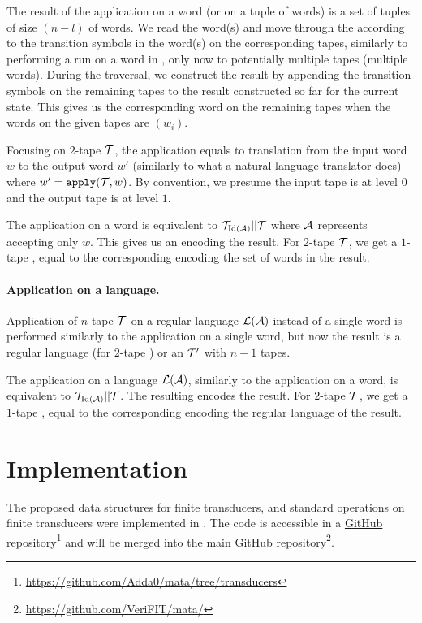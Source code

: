 The result of the application on a word (or on a tuple of words) is a set of tuples of size $(n - l)$ of words.
We read the word(s) and move through the \nft according to the transition symbols in the word(s) on the corresponding tapes, similarly to performing a run on a word in \nfa, only now to potentially multiple tapes (multiple words).
During the traversal, we construct the result by appending the transition symbols on the remaining tapes to the result constructed so far for the current state.
This gives us the corresponding word on the remaining tapes when the words on the given tapes are $(w_i)$.

Focusing on $2$-tape \nfts $\mathcal{T}$, the application equals to translation from the input word $w$ to the output word $w'$ (similarly to what a natural language translator does) where $w' = \texttt{apply}(\mathcal{T}, w)$.
By convention, we presume the input tape is at level $0$ and the output tape is at level $1$.

The application on a word is equivalent to $\mathcal{T}_{\text{Id}(\mathcal{A})} || \mathcal{T}$ where $\mathcal{A}$ represents \dfa accepting only $w$.
This gives us an \nft encoding the result.
For $2$-tape $\mathcal{T}$, we get a $1$-tape \nft, equal to the corresponding \nfa encoding the set of words in the result.

\paragraph{Application on a language.}
Application of $n$-tape \nft $\mathcal{T}$ on a regular language $\mathcal{L}(\mathcal{A})$ instead of a single word is performed similarly to the application on a single word, but now the result is a regular language (for $2$-tape \nfts) or an \nft $\mathcal{T}'$ with $n-1$ tapes.

The application on a language $\mathcal{L}(\mathcal{A})$, similarly to the application on a word, is equivalent to $\mathcal{T}_{\text{Id}(\mathcal{A})} || \mathcal{T}$.
The resulting \nft encodes the result.
For $2$-tape $\mathcal{T}$, we get a $1$-tape \nft, equal to the corresponding \nfa encoding the regular language of the result.

\section{Implementation}

The proposed data structures for finite transducers, and standard operations on finite transducers were implemented in \mata.
The code is accessible in a \href{https://github.com/Adda0/mata/tree/transducers}{GitHub repository}\footnote{\url{https://github.com/Adda0/mata/tree/transducers}} and will be merged into the main \mata \href{https://github.com/VeriFIT/mata/}{GitHub repository}\footnote{\url{https://github.com/VeriFIT/mata/}}.

